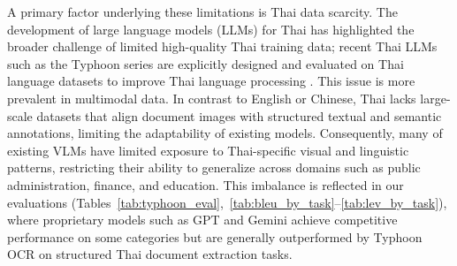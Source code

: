 \documentclass[]{typhoon} %
\begin{document}
A primary factor underlying these limitations is Thai data scarcity. The development of large language models (LLMs) for Thai has highlighted the broader challenge of limited high-quality Thai training data; recent Thai LLMs such as the Typhoon series are explicitly designed and evaluated on Thai language datasets to improve Thai language processing \citep{typhoon2}. This issue is more prevalent in multimodal data. In contrast to English or Chinese, Thai lacks large-scale datasets that align document images with structured textual and semantic annotations, limiting the adaptability of existing models.
Consequently, many of existing VLMs have limited exposure to Thai-specific visual and linguistic patterns, restricting their ability to generalize across domains such as public administration, finance, and education. This imbalance is reflected in our evaluations (Tables~\ref{tab:typhoon_eval},~\ref{tab:bleu_by_task}–\ref{tab:lev_by_task}), where proprietary models such as GPT and Gemini achieve competitive performance on some categories but are generally outperformed by Typhoon OCR on structured Thai document extraction tasks.

\end{document}
